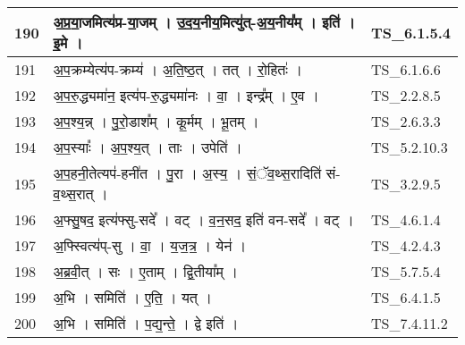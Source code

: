 \documentclass[17pt]{extarticle}
\begin{document}
\begin{longtable}{||p{0.4in}||p{4.9in}||p{0.9in}||}
    190 & अ॒प्र॒या॒जमित्य॑प्र{-}या॒जम्   ।   उ॒द॒य॒नीय॒मित्यु॑त्{-}अ॒य॒नीय᳚म्   ।   इति॑   ।   इ॒मे   ।    & TS\_6.1.5.4       \\
    
    \hline
        
    191 & अ॒प॒क्रम्येत्य॑प{-}क्रम्य॑   ।   अ॒ति॒ष्ठ॒त्   ।   तत्   ।   रो॒हितः॑   ।    & TS\_6.1.6.6       \\
    
    \hline
        
    192 & अ॒प॒रु॒द्ध्यमा॑न॒ इत्य॑प{-}रु॒द्ध्यमा॑नः   ।   वा॒   ।   इन्द्र᳚म्   ।   ए॒व   ।    & TS\_2.2.8.5       \\
    
    \hline
        
    193 & अ॒प॒श्य॒न्न्   ।   पु॒रो॒डाश᳚म्   ।   कू॒र्मम्   ।   भू॒तम्   ।    & TS\_2.6.3.3       \\
    
    \hline
        
    194 & अ॒प॒स्याः᳚   ।   अ॒प॒श्य॒त्   ।   ताः   ।   उपेति॑   ।    & TS\_5.2.10.3       \\
    
    \hline
        
    195 & अ॒प॒हनी॒तेत्यप॑{-}हनी॑त   ।   पु॒रा   ।   अ॒स्य॒   ।   सं॒ॅव॒थ्स॒रादिति॑ सं{-}व॒थ्स॒रात्   ।    & TS\_3.2.9.5       \\
    
    \hline
        
    196 & अ॒फ्सु॒षद॒ इत्य॑फ्सु{-}सदे᳚   ।   वट्   ।   व॒न॒सद॒ इति॑ वन{-}सदे᳚   ।   वट्   ।    & TS\_4.6.1.4       \\
    
    \hline
        
    197 & अ॒फ्स्वित्य॑प्{-}सु   ।   वा॒   ।   य॒ज॒त्र॒   ।   येन॑   ।    & TS\_4.2.4.3       \\
    
    \hline
        
    198 & अ॒ब्र॒वी॒त्   ।   सः   ।   ए॒ताम्   ।   द्वि॒तीया᳚म्   ।    & TS\_5.7.5.4       \\
    
    \hline
        
    199 & अ॒भि   ।   समिति॑   ।   ए॒ति॒   ।   यत्   ।    & TS\_6.4.1.5       \\
    
    \hline
        
    200 & अ॒भि   ।   समिति॑   ।   प॒द्य॒न्ते॒   ।   द्वे इति॑   ।    & TS\_7.4.11.2       \\
    

\end{longtable}
\end{document}

